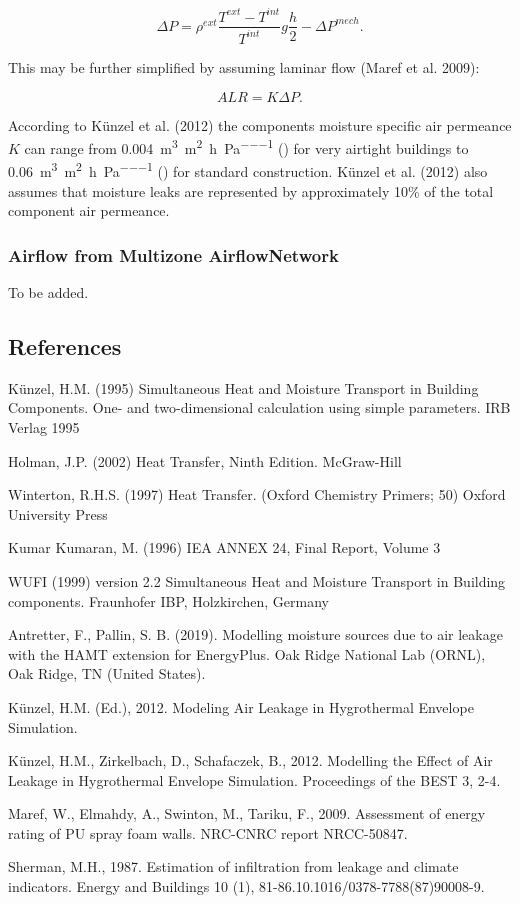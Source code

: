 \begin{equation}
\Delta P=\rho ^{ext} \frac{T^{ext}-T^{int}}{T^{int}} g \frac{h}{2} -\Delta P^{mech}.
\end{equation}

This may be further simplified by assuming laminar flow (Maref et al. 2009):

\begin{equation}\label{hamt-k-dp}
ALR = K \Delta P.
\end{equation}

According to K\"unzel et al. (2012) the components moisture specific air
permeance $K$ can range from
\SI{0.004}{\meter\cubed\per\meter\squared\per\hour\per\pascal}
() for very airtight buildings
to \SI{0.06}{\meter\cubed\per\meter\squared\per\hour\per\pascal}
() for standard construction.
K\"unzel et al. (2012) also assumes that moisture leaks are represented by
approximately 10\% of the total component air permeance.

\subsubsection{Airflow from Multizone AirflowNetwork}
To be added.

\subsection{References}\label{references-012}

K\"unzel, H.M. (1995) Simultaneous Heat and Moisture Transport in Building
Components. One- and two-dimensional calculation using simple parameters.
IRB Verlag 1995

Holman, J.P. (2002) Heat Transfer, Ninth Edition. McGraw-Hill

Winterton, R.H.S. (1997) Heat Transfer. (Oxford Chemistry Primers; 50)
Oxford University Press

Kumar Kumaran, M. (1996) IEA ANNEX 24, Final Report, Volume 3

WUFI (1999) version 2.2 Simultaneous Heat and Moisture Transport in
Building components. Fraunhofer IBP, Holzkirchen, Germany

Antretter, F.,  Pallin, S. B. (2019). Modelling moisture sources due to air
leakage with the HAMT extension for EnergyPlus. Oak Ridge National Lab (ORNL),
Oak Ridge, TN (United States).

K\"unzel, H.M. (Ed.), 2012. Modeling Air Leakage in Hygrothermal Envelope
Simulation.

K\"unzel, H.M., Zirkelbach, D., Schafaczek, B., 2012. Modelling the Effect of Air
Leakage in Hygrothermal Envelope Simulation. Proceedings of the BEST 3, 2-4.

Maref, W., Elmahdy, A., Swinton, M., Tariku, F., 2009. Assessment of energy rating of PU spray foam walls. NRC-CNRC report NRCC-50847.

Sherman, M.H., 1987. Estimation of infiltration from leakage and climate indicators. Energy and Buildings 10 (1), 81-86.10.1016/0378-7788(87)90008-9.

